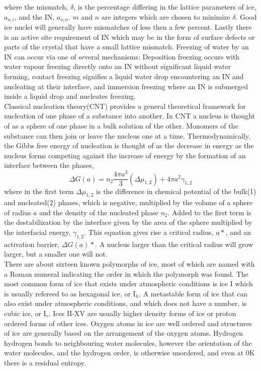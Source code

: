 \documentclass[titlepage]{article}
\begin{document}
where the mismatch, $\delta$, is the percentage differing in the lattice parameters of ice, $a_{o,i}$, and the IN, $a_{o,n}$.  $m$ and $n$ are integers which are chosen to minimize $\delta$.  Good ice nuclei will generally have mismatches of less then a few percent.  Lastly there is an active site requirement of IN which may be in the form of surface defects or parts of the crystal that have a small lattice mismatch.  Freezing of water by an IN can occur via one of several mechanisms: Deposition freezing occurs with water vapour freezing directly onto an IN without significant liquid water forming, contact freezing signifies a liquid water drop encountering an IN and nucleating at their interface, and immersion freezing where an IN is submerged inside a liquid drop and nucleates freezing.\\
\indent Classical nucleation theory(CNT) provides a general theoretical framework for nucleation of one phase of a substance into another\cite{SP06, HB09}.  In CNT a nucleus is thought of as a sphere of one phase in a bulk solution of the other.  Monomers of the substance can then join or leave the nucleus one at a time.  Thermodynamically, the Gibbs free energy of nucleation is thought of as the decrease in energy as the nucleus forms competing against the increase of energy by the formation of an interface between the phases,
\begin{equation}
\Delta G(a)=n_{2}\frac{4\pi a^{3}}{3}(\Delta \mu_{1,2})+4\pi a^{2}\gamma_{1,2}
\label{CNTfree}
\end{equation}
where in the first term $\Delta \mu_{1,2}$ is the difference in chemical potential of the bulk(1) and nucleated(2) phases, which is negative, multiplied by the volume of a sphere of radius $a$ and the density of the nucleated phase $n_{2}$.  Added to the first term is the destabilization by the interface given by the area of the sphere multiplied by the interfacial energy, $\gamma_{1,2}$.  This equation gives rise a critical radius, $a*$, and an activation barrier, $\Delta G(a)*$.  A nucleus larger than the critical radius will grow larger, but a smaller one will not.\\
\indent There are about sixteen known polymorphs of ice\cite{M09}, most of which are named with a Roman numeral indicating the order in which the polymorph was found.  The most common form of ice that exists under atmospheric conditions is ice I which is usually refereed to as hexagonal ice, or I$_{h}$.  A metastable form of ice that can also exist under atmospheric conditions, and which does not have a number, is cubic ice, or I$_{c}$.  Ices II-XV are usually higher density forms of ice or proton ordered forms of other ices.  Oxygen atoms in ice are well ordered and structures of ice are generally based on the arrangement of the oxygen atoms.  Hydrogen hydrogen bonds to neighbouring water molecules, however the orientation of the water molecules, and the hydrogen order, is otherwise unordered, and even at 0K there is a residual entropy.\\
\end{document}
